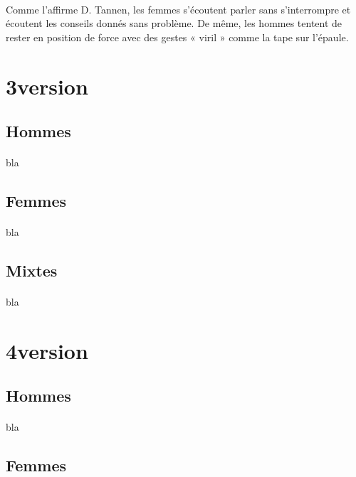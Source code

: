 \paragraph{}
Comme l’affirme D. Tannen, les femmes s’écoutent parler sans s’interrompre et écoutent les conseils donnés sans problème. De même, les hommes tentent de rester en position de force avec des gestes « viril » comme la tape sur l’épaule.

\section{3\ieme version}
\paragraph{}
\subsection{Hommes}
\paragraph{}
bla

\subsection{Femmes}
\paragraph{}
bla

\subsection{Mixtes}
\paragraph{}
bla

\section{4\ieme version}
\subsection{Hommes}
\paragraph{}
bla

\subsection{Femmes}

